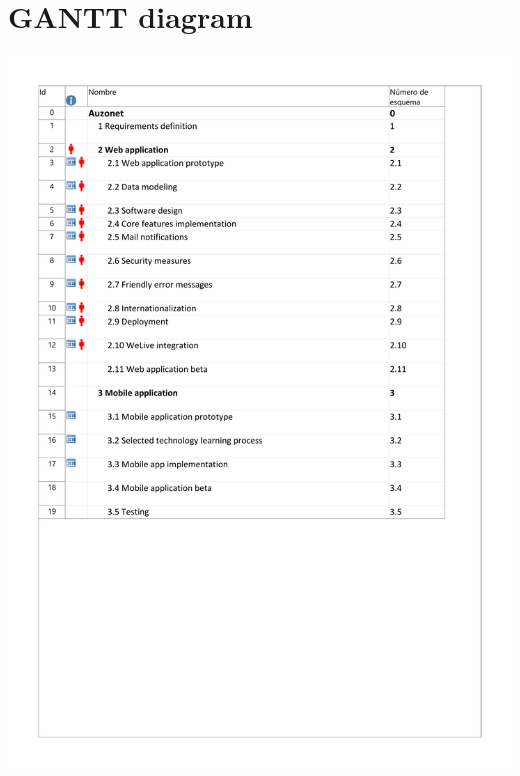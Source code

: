 \documentclass{DeustoFDP}
\begin{document}
\section{GANTT diagram}
\begin{center}
	\includegraphics[width=1\linewidth]{fig/g1}
\end{center}
\end{document}
